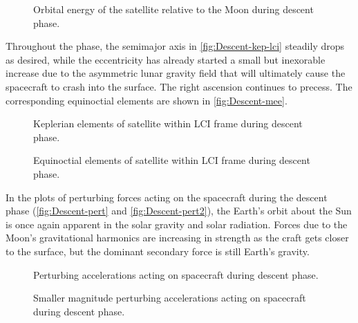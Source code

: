 \begin{figure}
\centering
\def\svgwidth{\figurewidth}

\caption{Orbital energy of the satellite relative to the Moon during descent phase.} \label{fig:Descent-orbeng}
\end{figure}

Throughout the phase, the semimajor axis in \autoref{fig:Descent-kep-lci} steadily drops as desired, while the eccentricity has already started a small but inexorable increase due to the asymmetric lunar gravity field that will ultimately cause the spacecraft to crash into the surface. The right ascension continues to precess. The corresponding equinoctial elements are shown in \autoref{fig:Descent-mee}.

\begin{figure}
\centering
\def\svgwidth{\figurewidth}

\caption{Keplerian elements of satellite within LCI frame during descent phase.} \label{fig:Descent-kep-lci}
\end{figure}

\begin{figure}
\centering
\def\svgwidth{\figurewidth}

\caption{Equinoctial elements of satellite within LCI frame during descent phase.} \label{fig:Descent-mee}
\end{figure}

In the plots of perturbing forces acting on the spacecraft during the descent phase (\autoref{fig:Descent-pert} and \autoref{fig:Descent-pert2}), the Earth's orbit about the Sun is once again apparent in the solar gravity and solar radiation. Forces due to the Moon's gravitational harmonics are increasing in strength as the craft gets closer to the surface, but the dominant secondary force is still Earth's gravity.

\begin{subfigures}
\begin{figure}
\centering
\def\svgwidth{\figurewidth}

\caption{Perturbing accelerations acting on spacecraft during descent phase.} \label{fig:Descent-pert}
\end{figure}

\begin{figure}
\centering
\def\svgwidth{\figurewidth}

\caption{Smaller magnitude perturbing accelerations acting on spacecraft during descent phase.} \label{fig:Descent-pert2}
\end{figure}
\end{subfigures}

